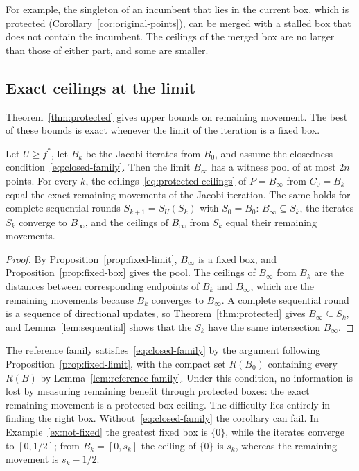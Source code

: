 For example, the singleton of an incumbent that lies in the current box,
which is protected (Corollary~\ref{cor:original-points}), can be merged
with a stalled box that does not contain the incumbent. The ceilings of the merged box are
no larger than those of either part, and some are smaller.

\subsection{Exact ceilings at the limit}\label{sec:cert-limits}

Theorem~\ref{thm:protected} gives upper bounds on remaining movement. The
best of these bounds is exact whenever the limit of the iteration is a
fixed box.

\begin{corollary}\label{cor:limit-ceilings}
Let $U\ge f^*$, let $B_k$ be the Jacobi iterates from $B_0$, and assume
the closedness condition~\eqref{eq:closed-family}. Then the limit
$B_\infty$ has a witness pool of at most $2n$ points. For every $k$, the
ceilings~\eqref{eq:protected-ceilings} of $P=B_\infty$ from $C_0=B_k$
equal the exact remaining movements of the Jacobi iteration. The same
holds for complete sequential rounds $S_{k+1}=S_U(S_k)$ with $S_0=B_0$:
$B_\infty\subseteq S_k$, the iterates $S_k$ converge to $B_\infty$, and
the ceilings of $B_\infty$ from $S_k$ equal their remaining movements.
\end{corollary}
\begin{proof}
By Proposition~\ref{prop:fixed-limit}, $B_\infty$ is a fixed box, and
Proposition~\ref{prop:fixed-box} gives the pool. The ceilings of
$B_\infty$ from $B_k$ are the distances between corresponding endpoints
of $B_k$ and $B_\infty$, which are the remaining movements because $B_k$
converges to $B_\infty$. A complete sequential round is a sequence of
directional updates, so Theorem~\ref{thm:protected} gives
$B_\infty\subseteq S_k$, and Lemma~\ref{lem:sequential} shows that the
$S_k$ have the same intersection $B_\infty$.
\end{proof}

The reference family satisfies~\eqref{eq:closed-family} by the argument
following Proposition~\ref{prop:fixed-limit}, with the compact set
$R(B_0)$ containing every $R(B)$ by Lemma~\ref{lem:reference-family}.
Under this condition, no information is lost by measuring remaining
benefit through protected boxes: the exact remaining movement is a
protected-box ceiling. The difficulty lies entirely in finding the right
box. Without~\eqref{eq:closed-family} the corollary can fail. In
Example~\ref{ex:not-fixed} the greatest fixed box is $\{0\}$, while the
iterates converge to $[0,1/2]$; from $B_k=[0,s_k]$ the ceiling of
$\{0\}$ is $s_k$, whereas the remaining movement is $s_k-1/2$.

